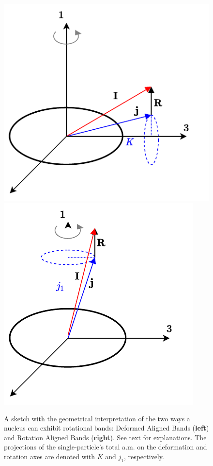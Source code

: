 \begin{figure}
    \centering
    \includegraphics[scale=0.9]{Chapters/Figures/DAL_scheme.pdf}
    \includegraphics[scale=0.9]{Chapters/Figures/RAL_scheme.pdf}
    \caption{A sketch with the geometrical interpretation of the two ways a nucleus can exhibit rotational bands: Deformed Aligned Bands (\textbf{left}) and Rotation Aligned Bands (\textbf{right}). See text for explanations. The projections of the single-particle's total a.m. on the deformation and rotation axes are denoted with $K$ and $j_1$, respectively.}
    \label{ral-dal-coupling-bands}
\end{figure}

